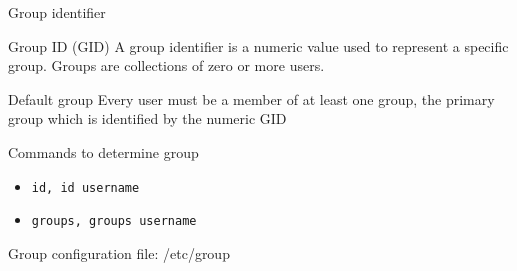 \begin{frame}[fragile]{Group identifier}

\begin{block}{Group ID (GID)}
\alert{A group identifier} is a numeric value used to represent a specific group.
Groups are collections of zero or more users.
\end{block}

\begin{block}{Default group}
 Every user must be a member of at least one group, the \alert{primary group} which is identified by the numeric GID
\end{block}

Commands to determine group
  \begin{itemize}
    \item \verb|id, id username|
    \item \verb|groups, groups username|
  \end{itemize}
Group configuration file:  \alert{/etc/group}
\end{frame}
